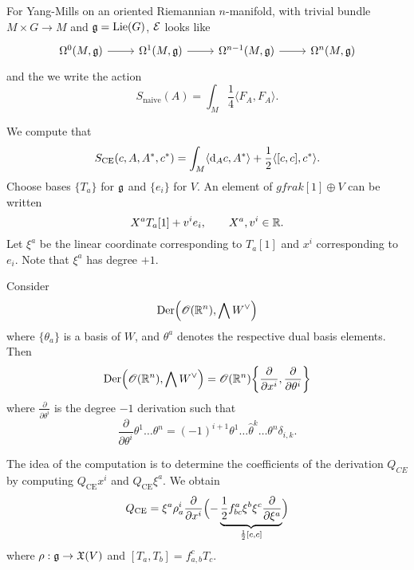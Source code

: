 For Yang-Mills on an oriented Riemannian $n$-manifold, with trivial bundle $M \times G \to M$ and $\mathfrak{g} = \operatorname{Lie} (G)$, $\mathcal{E}$ looks like
\begin{equation*}
  \begin{tikzcd}
    \Omega^0(M, \gfrak) \arrow[r] &
    \Omega^1 (M, \gfrak) \arrow[r] &
    \Omega^{n-1} (M, \gfrak) \arrow[r] &
    \Omega^n (M, \gfrak)
  \end{tikzcd}
\end{equation*}
and the we write the action
\begin{equation*}
  S_{\text{naive}} (A) = \int_M \frac{1}{4} \langle F_A, F_A \rangle.
\end{equation*}

We compute that
\begin{equation*}
  S_{\text{CE}}(c, A, A^*, c^*)
  = \int_M \langle \mathrm{d}_A c, A^* \rangle + \frac{1}{2} \langle [c, c], c^* \rangle.
\end{equation*}
Choose bases $\{ T_a \}$ for $\mathfrak{g}$ and $\{ e_i \}$ for $V$.
An element of $gfrak[1] \oplus V$ can be written
\begin{equation*}
  X^a T_a [1] + v^i e_i, \qquad  X^a, v^i \in \mathbb{R}.
\end{equation*}
Let $\xi^a$ be the linear coordinate corresponding to $T_a [1]$ and $x^i$ corresponding to $e_i$.
Note that $\xi^a$ has degree $+1$.

\begin{theorem}
  Consider
  \begin{equation*}
    \operatorname{Der} \Bigl( \mathscr{O}(\mathbb{R}^n), \bigwedge  W^{\vee} \Bigr)
  \end{equation*}
  where $\{ \theta_a \}$ is a basis of $W$, and $\theta^a$ denotes the respective dual basis elements. Then
  \begin{equation*}
    \operatorname{Der} \Bigl( \mathscr{O}(\mathbb{R}^n), \bigwedge W^{\vee} \Bigr)
    = \mathscr{O}(\mathbb{R}^n) \biggl\{ \frac{\partial}{\partial x^i}, \frac{\partial}{\partial \theta^i} \biggr\}
  \end{equation*}
  where $\frac{\partial}{\partial \theta^i}$ is the degree $-1$ derivation such that
  \begin{equation*}
    \frac{\partial}{\partial \theta^i} \theta^{1} \dots \theta^{n}
    = (-1)^{i+1} \theta^1 \dots \hat{\theta}^k \dots \theta^n \delta_{i,k}.
   \end{equation*}
\end{theorem}

The idea of the computation is to determine the coefficients of the derivation $Q_{CE}$ by computing $Q_{\text{CE}} x^i$ and $Q_{\text{CE}} \xi^a$.
We obtain
\begin{equation*}
  Q_{\text{CE}} = \xi^a \rho_a^i \frac{\partial}{\partial x^i}
  \Bigl( - \underbrace{\frac{1}{2} f_{bc}^a \xi^b \xi^c \frac{\partial}{\partial \xi^a}}_{\frac{1}{2} [c, c]} \Bigr)
\end{equation*}
where $\rho: \mathfrak{g} \to \mathfrak{X}(V)$ and $[T_a, T_b] = f_{a, b}^c T_c$.

